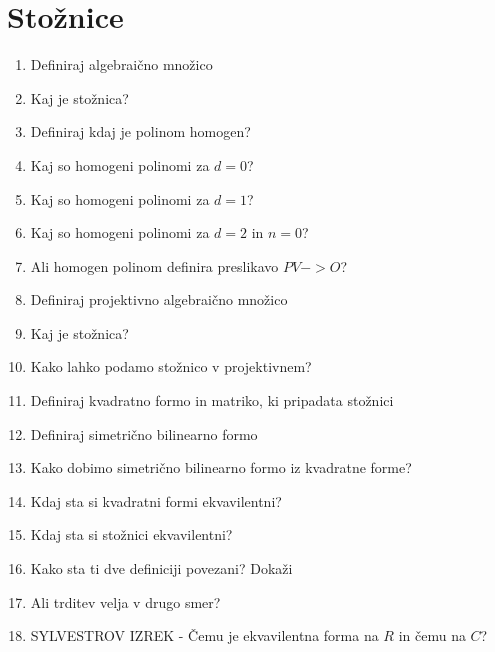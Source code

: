 \documentclass{article}
\begin{document}
    \section{Stožnice}
    \begin{enumerate}
        \item Definiraj algebraično množico
        \item Kaj je stožnica?
        \item Definiraj kdaj je polinom homogen?
        \item Kaj so homogeni polinomi za $d = 0$?
        \item Kaj so homogeni polinomi za $d = 1$?
        \item Kaj so homogeni polinomi za $d = 2$ in $n=0$?
        \item Ali homogen polinom definira preslikavo $PV -> O$?
        \item Definiraj projektivno algebraično množico
        \item Kaj je stožnica?
        \item Kako lahko podamo stožnico v projektivnem?
        \item Definiraj kvadratno formo in matriko, ki pripadata stožnici
        \item Definiraj simetrično bilinearno formo
        \item Kako dobimo simetrično bilinearno formo iz kvadratne forme?
        
        \item Kdaj sta si kvadratni formi ekvavilentni?
        \item Kdaj sta si stožnici ekvavilentni?
        \item Kako sta ti dve definiciji povezani? Dokaži
        \item Ali trditev velja v drugo smer?
        \item SYLVESTROV IZREK - Čemu je ekvavilentna forma na $R$ in čemu na $C$?
    \end{enumerate}
\end{document}
